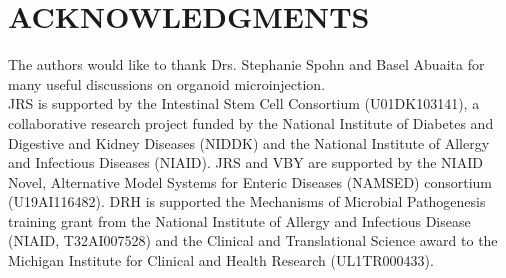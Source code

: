 \documentclass[11pt]{article}
\begin{document}
\section*{ACKNOWLEDGMENTS}
The authors would like to thank Drs. Stephanie Spohn and Basel Abuaita for many useful discussions on organoid microinjection.\\
JRS is supported by the Intestinal Stem Cell Consortium (U01DK103141), a collaborative research project funded by the National Institute of Diabetes and Digestive and Kidney Diseases (NIDDK) and the National Institute of Allergy and Infectious Diseases (NIAID). JRS and VBY are supported by the NIAID Novel, Alternative Model Systems for Enteric Diseases (NAMSED) consortium (U19AI116482). DRH is supported the Mechanisms of Microbial Pathogenesis training grant from the National Institute of Allergy and Infectious Disease (NIAID, T32AI007528) and the Clinical and Translational Science award to the Michigan Institute for Clinical and Health Research (UL1TR000433).\\
\printbibliography
\end{document}
